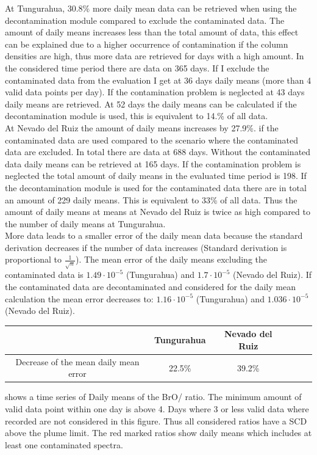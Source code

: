\documentclass  [
  paper    = a4,
  BCOR     = 10mm,
  twoside,
  fontsize = 12pt,
  fleqn,
  toc      = bibnumbered,
  toc      = listofnumbered,
  numbers  = noendperiod,
  headings = normal,
  listof   = leveldown,
  version  = 3.03
]                                       {scrreprt}
\begin{document}
At Tungurahua, 30.8\% more daily mean data can be retrieved when using the decontamination module compared to exclude the contaminated data. The amount of daily means increases less than the total amount of data, this effect can be explained due to a higher occurrence of contamination if the   column densities are high, thus more data are retrieved for days with a high   amount.
In the considered time period there are data on 365 days. 
If I exclude the contaminated data from the evaluation I get at 36 days daily means (more than 4 valid data points per day). If the contamination problem is neglected at 43 days daily means are retrieved. At 52 days the daily means can be calculated if the decontamination module is used, this is equivalent to 14.\% of all data.\\

At Nevado del Ruiz the amount of daily means increases by 27.9\%. if the contaminated data are used compared to the scenario where the contaminated data are excluded.
In total there are data at 688 days. Without the contaminated data daily means can be retrieved at 165 days.
If the contamination problem is neglected the total amount of daily means in the evaluated time period is 198. If the decontamination module is used for the contaminated data there are in total an amount of 229 daily means. This is equivalent to 33\% of all data. Thus the amount of daily means at means at Nevado del Ruiz is twice as high compared to the number of daily means at Tungurahua.\\
%
More data leads to a smaller error of the daily mean data because the standard derivation decreases if the number of data increases (Standard derivation is proportional to $\frac{1}{\sqrt{n}}$). The mean error of the daily means excluding the contaminated data is $1.49\cdot 10^{-5}$ (Tungurahua) and $1.7\cdot 10^{-5}$ (Nevado del Ruiz). If the contaminated data are decontaminated and considered for the daily mean calculation the mean error decreases to: $1.16\cdot 10^{-5}$ (Tungurahua) and $1.036\cdot 10^{-5}$ (Nevado del Ruiz).
\begin{table}
	\centering
	\begin{tabular}{ccc p{4cm}p{4cm}p{4cm}}
		&Tungurahua&Nevado del Ruiz\\
		\toprule
		Decrease of the mean daily mean error&22.5\%&39.2\%\\
		\bottomrule            
	\end{tabular}
\end{table}        
 shows a time series of Daily means of the BrO/ ratio. The minimum amount of valid data point within one day is above 4. Days where 3 or less valid data where recorded are not considered in this figure.  Thus all considered ratios have a  SCD above the plume limit. The red marked ratios show daily means which includes at least one contaminated spectra.
\end{document}

